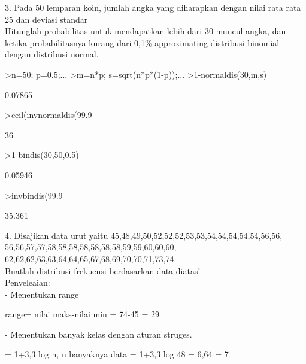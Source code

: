 \documentclass[12pt,Times new roman,letterpaper]{book}
\begin{document}
\begin{eulernootebook}
\begin{eulercomment}
\begin{eulercomment}
\begin{eulernootebook}
\begin{eulercomment}
\begin{eulercomment}
\begin{eulercomment}
\begin{eulercomment}
\begin{eulercomment}
\begin{eulercomment}
\begin{eulercomment}
\begin{eulercomment}
\begin{eulercomment}
\begin{eulercomment}
\begin{eulercomment}
\begin{eulercomment}
\begin{eulercomment}
\begin{eulercomment}
3. Pada 50 lemparan koin, jumlah angka yang diharapkan dengan nilai
rata rata 25 dan deviasi standar\\
Hitunglah probabilitas untuk mendapatkan lebih dari 30 muncul angka,
dan ketika probabilitasnya kurang dari 0,1\% approximating distribusi
binomial dengan distribusi normal.
\end{eulercomment}
\begin{eulerprompt}
>n=50; p=0.5;...
>m=n*p; s=sqrt(n*p*(1-p));...
>1-normaldis(30,m,s)
\end{eulerprompt}
\begin{euleroutput}
  0.07865
\end{euleroutput}
\begin{eulerprompt}
>ceil(invnormaldis(99.9%
\end{eulerprompt}
\begin{euleroutput}
  36
\end{euleroutput}
\begin{eulerprompt}
>1-bindis(30,50,0.5)
\end{eulerprompt}
\begin{euleroutput}
  0.05946
\end{euleroutput}
\begin{eulerprompt}
>invbindis(99.9%
\end{eulerprompt}
\begin{euleroutput}
  35.361
\end{euleroutput}
\begin{eulercomment}
4. Disajikan data urut yaitu
45,48,49,50,52,52,52,53,53,54,54,54,54,54,56,56,
56,56,57,57,58,58,58,58,58,58,58,59,59,60,60,60,
62,62,62,63,63,64,64,65,67,68,69,70,70,71,73,74.\\
Buatlah distribusi frekuensi berdasarkan data diatas!\\
Penyeleaian:\\
- Menentukan range\\
\end{eulercomment}
\begin{eulerttcomment}
  range= nilai maks-nilai min
       = 74-45
       = 29
\end{eulerttcomment}
\begin{eulercomment}
- Menentukan banyak kelas dengan aturan struges.\\
\end{eulercomment}
\begin{eulerttcomment}
  = 1+3,3 log n, n banyaknya data
  = 1+3,3 log 48
  = 6,64
  = 7
\end{eulerttcomment}

\end{eulercomment}
\end{eulercomment}
\end{eulercomment}
\end{eulercomment}
\end{eulercomment}
\end{eulercomment}
\end{eulercomment}
\end{eulercomment}
\end{eulercomment}
\end{eulercomment}
\end{eulercomment}
\end{eulercomment}
\end{eulercomment}
\end{eulernootebook}
\end{eulercomment}
\end{eulercomment}
\end{eulernootebook}
\end{document}
